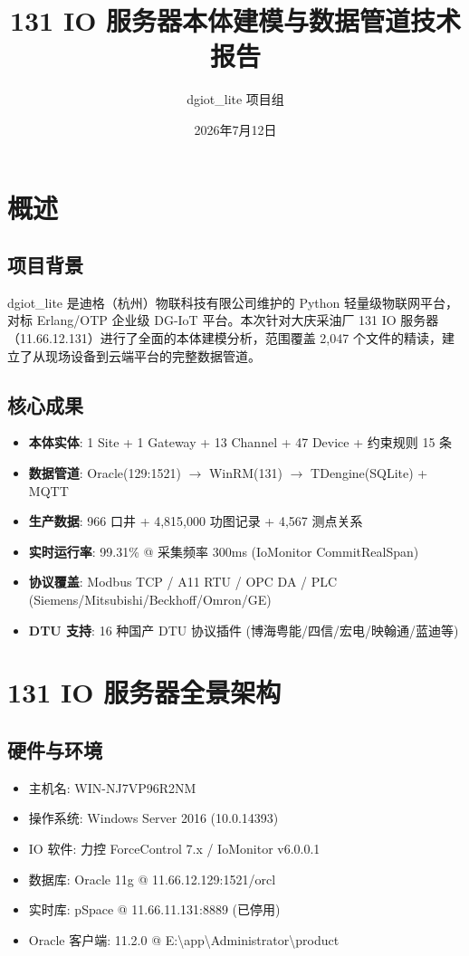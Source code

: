 \documentclass[12pt,a4paper]{ctexart}
\title{\textbf{131 IO 服务器本体建模与数据管道技术报告}}
\author{dgiot\_lite 项目组}
\date{2026年7月12日}
\begin{document}
\maketitle
\tableofcontents
\newpage

\section{概述}

\subsection{项目背景}

dgiot\_lite 是迪格（杭州）物联科技有限公司维护的 Python 轻量级物联网平台，对标 Erlang/OTP 企业级 DG-IoT 平台。本次针对大庆采油厂 131 IO 服务器（11.66.12.131）进行了全面的本体建模分析，范围覆盖 2,047 个文件的精读，建立了从现场设备到云端平台的完整数据管道。

\subsection{核心成果}

\begin{itemize}[leftmargin=*]
  \item \textbf{本体实体}: 1 Site + 1 Gateway + 13 Channel + 47 Device + 约束规则 15 条
  \item \textbf{数据管道}: Oracle(129:1521) $\rightarrow$ WinRM(131) $\rightarrow$ TDengine(SQLite) + MQTT
  \item \textbf{生产数据}: 966 口井 + 4,815,000 功图记录 + 4,567 测点关系
  \item \textbf{实时运行率}: 99.31\% @ 采集频率 300ms (IoMonitor CommitRealSpan)
  \item \textbf{协议覆盖}: Modbus TCP / A11 RTU / OPC DA / PLC (Siemens/Mitsubishi/Beckhoff/Omron/GE)
  \item \textbf{DTU 支持}: 16 种国产 DTU 协议插件 (博海粤能/四信/宏电/映翰通/蓝迪等)
\end{itemize}

\section{131 IO 服务器全景架构}

\subsection{硬件与环境}

\begin{itemize}[leftmargin=*]
  \item 主机名: WIN-NJ7VP96R2NM
  \item 操作系统: Windows Server 2016 (10.0.14393)
  \item IO 软件: 力控 ForceControl 7.x / IoMonitor v6.0.0.1
  \item 数据库: Oracle 11g @ 11.66.12.129:1521/orcl
  \item 实时库: pSpace @ 11.66.11.131:8889 (已停用)
  \item Oracle 客户端: 11.2.0 @ E:\textbackslash app\textbackslash Administrator\textbackslash product
\end{itemize}
\end{document}
